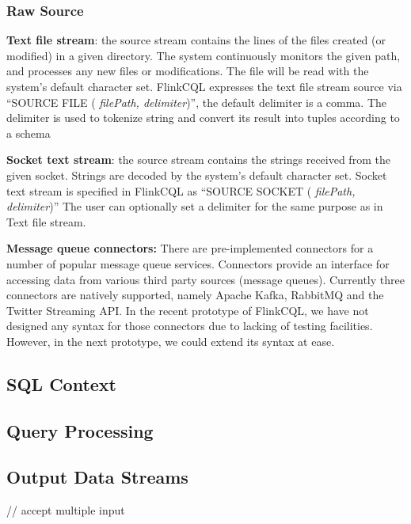 \subsubsection*{Raw Source}


\textbf{Text file stream}: the source stream contains the lines of the files created (or modified) in a given directory. The system continuously monitors the given path, and processes any new files or modifications. The file will be read with the system’s default character set. FlinkCQL expresses the text file stream source via ``SOURCE FILE ( \textit{filePath, delimiter})'', the default delimiter is a comma. The delimiter is used to tokenize string and convert its result into tuples according to a schema


\textbf{Socket text stream}: the source stream contains the strings received from the given socket. Strings are decoded by the system’s default character set. Socket text stream is specified in FlinkCQL as ``SOURCE SOCKET ( \textit{filePath, delimiter})''
The user can optionally set a delimiter for the same purpose as in Text file stream.


\textbf{Message queue connectors:} There are pre-implemented connectors for a number of popular message queue services. Connectors provide an interface for accessing data from various third party sources (message queues). Currently three connectors are natively supported, namely Apache Kafka, RabbitMQ and the Twitter Streaming API. In the recent prototype of FlinkCQL, we have not designed any syntax for those connectors due to lacking of testing facilities. However, in the next prototype, we could extend its syntax at ease.

\subsection{SQL Context}


\subsection{Query Processing}

\subsection{Output Data Streams}

// accept multiple input

